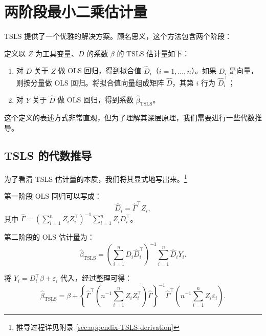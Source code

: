 \section{两阶段最小二乘估计量}\label{sec:TSLS-estimator}

TSLS 提供了一个优雅的解决方案。顾名思义，这个方法包含两个阶段：

\begin{Definition}[两阶段最小二乘估计量]\label{def:TSLS}
定义以 $Z$ 为工具变量、$D$ 的系数 $\beta$ 的 TSLS 估计量如下：
\begin{enumerate}
\item[\textbf{第一阶段}] 对 $D$ 关于 $Z$ 做 OLS 回归，得到拟合值 $\hat{D}_i$（$i=1,\ldots,n$）。如果 $D_i$ 是向量，则按分量做 OLS 回归。将拟合值向量组成矩阵 $\hat{D}$，其第 $i$ 行为 $\hat{D}_i^{\top}$；
\item[\textbf{第二阶段}] 对 $Y$ 关于 $\hat{D}$ 做 OLS 回归，得到系数 $\hat{\beta}_{\mathrm{TSLS}}$。
\end{enumerate}
\end{Definition}

这个定义的表述方式非常直观，但为了理解其深层原理，我们需要进行一些代数推导。

\subsection{TSLS 的代数推导}\label{sec:TSLS-algebra}

为了看清 TSLS 估计量的本质，我们将其显式地写出来。\footnote{推导过程详见附录 \cref{sec:appendix-TSLS-derivation}}

第一阶段 OLS 回归可以写成：
\begin{equation}
\hat{D}_i = \hat{\Gamma}^{\top}Z_i, \label{eq:23.3}
\end{equation}
其中 $\hat{\Gamma} = \left(\sum_{i=1}^{n}Z_iZ_i^{\top}\right)^{-1}\sum_{i=1}^{n}Z_iD_i^{\top}$。

第二阶段的 OLS 估计量为：
\begin{equation}
\hat{\beta}_{\mathrm{TSLS}} = \left(\sum_{i=1}^{n}\hat{D}_i\hat{D}_i^{\top}\right)^{-1}\sum_{i=1}^{n}\hat{D}_iY_i. \label{eq:23.4}
\end{equation}

将 $Y_i = D_i^{\top}\beta + \varepsilon_i$ 代入，经过整理可得：
\begin{equation}
\hat{\beta}_{\mathrm{TSLS}} = \beta + \left\{\hat{\Gamma}^{\top}\left(n^{-1}\sum_{i=1}^{n}Z_iZ_i^{\top}\right)\hat{\Gamma}\right\}^{-1}\hat{\Gamma}^{\top}\left(n^{-1}\sum_{i=1}^{n}Z_i\varepsilon_i\right). \label{eq:23.5}
\end{equation}

